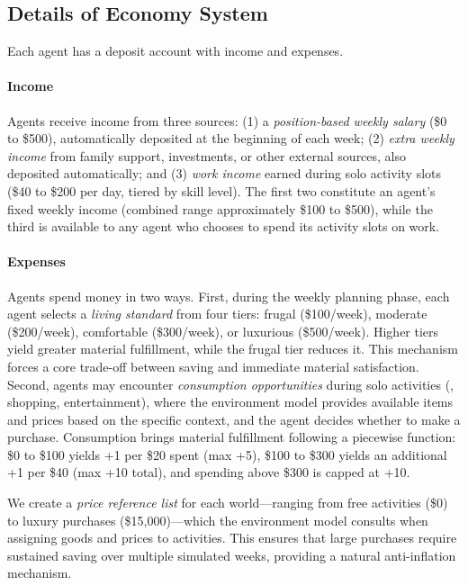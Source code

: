 \subsection{Details of Economy System}
\label{app:economy}

Each agent has a deposit account with income and expenses.

\paragraph{Income}
Agents receive income from three sources:
(1) a \textit{position-based weekly salary} (\$0 to \$500), automatically deposited at the beginning of each week;
(2) \textit{extra weekly income} from family support, investments, or other external sources, also deposited automatically;
and (3) \textit{work income} earned during solo activity slots (\$40 to \$200 per day, tiered by skill level).
The first two constitute an agent's fixed weekly income (combined range approximately \$100 to \$500),
while the third is available to any agent who chooses to spend its activity slots on work.

\paragraph{Expenses}
Agents spend money in two ways.
First, during the weekly planning phase, each agent selects a \textit{living standard} from four tiers:
frugal (\$100/week), moderate (\$200/week), comfortable (\$300/week), or luxurious (\$500/week).
Higher tiers yield greater material fulfillment, while the frugal tier reduces it.
This mechanism forces a core trade-off between saving and immediate material satisfaction.
Second, agents may encounter \textit{consumption opportunities} during solo activities (\eg, shopping, entertainment),
where the environment model provides available items and prices based on the specific context, and the agent decides whether to make a purchase.
Consumption brings material fulfillment following a piecewise function:
\$0 to \$100 yields +1 per \$20 spent (max +5),
\$100 to \$300 yields an additional +1 per \$40 (max +10 total),
and spending above \$300 is capped at +10.

We create a \textit{price reference list} for each world---ranging from free activities (\$0) to luxury purchases (\$15{,}000)---which the environment model consults when assigning goods and prices to activities.
This ensures that large purchases require sustained saving over multiple simulated weeks, providing a natural anti-inflation mechanism.




